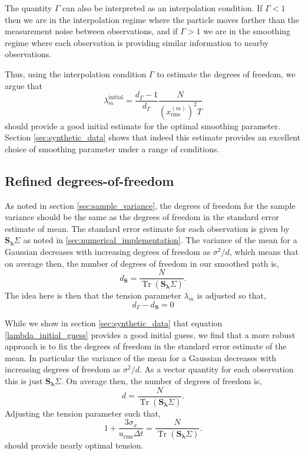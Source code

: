 \documentclass[10pt,journal]{IEEEtran}
\DeclareMathOperator{\Tr}{Tr}
\begin{document}
The quantity $\Gamma$ can also be interpreted as an interpolation condition. If $\Gamma<1$ then we are in the interpolation regime where the particle moves farther than the measurement noise between observations, and if $\Gamma >1$ we are in the smoothing regime where each observation is providing similar information to nearby observations.

Thus, using the interpolation condition $\Gamma$ to estimate the degrees of freedom, we argue that
\begin{equation}
\label{lambda_initial_guess}
\lambda^{\textrm{initial}}_m = \frac{d_\Gamma-1}{d_\Gamma} \frac{N}{ \left(x^{(m)}_{\textrm{rms}}\right)^2  T}
\end{equation}
should provide a good initial estimate for the optimal smoothing parameter. Section \ref{sec:synthetic_data} shows that indeed this estimate provides an excellent choice of smoothing parameter under a range of conditions.

\subsection{Refined degrees-of-freedom} \label{refined_dof}

As noted in section \ref{sec:sample_variance}, the degrees of freedom for the sample variance should be the same as the degrees of freedom in the standard error estimate of mean. The standard error estimate for each observation is given by $\mathbf{S_\lambda} \Sigma$ as noted in \ref{sec:numerical_implementation}. The variance of the mean for a Gaussian decreases with increasing degrees of freedom as $\sigma^2/d$, which means that on average then, the number of degrees of freedom in our smoothed path is,
\begin{equation}
d_{\mathbf{S}} = \frac{N}{\Tr \left(\mathbf{S_\lambda} \Sigma \right) }.
\end{equation}
The idea here is then that the tension parameter $\lambda_m$ is adjusted so that,
\begin{equation}
d_\Gamma - d_{\mathbf{S}} = 0
\end{equation}

While we show in section \ref{sec:synthetic_data} that equation \ref{lambda_initial_guess} provides a good initial guess, we find that a more robust approach is to fix the degrees of freedom in the standard error estimate of the mean. In particular the variance of the mean for a Gaussian decreases with increasing degrees of freedom as $\sigma^2/d$. As a vector quantity for each observation this is just $\mathbf{S_\lambda} \Sigma$. On average then, the number of degrees of freedom is,
\begin{equation}
d = \frac{N}{\Tr \left(\mathbf{S_\lambda} \Sigma \right) }.
\end{equation}
Adjusting the tension parameter such that,
\begin{equation}
\label{iterated_tension}
1 + \frac{3 \sigma_x}{u_{\textrm{rms}}\Delta t} = \frac{N}{\Tr \left(\mathbf{S_\lambda} \Sigma \right) }.
\end{equation}
should provide nearly optimal tension.
\end{document}
